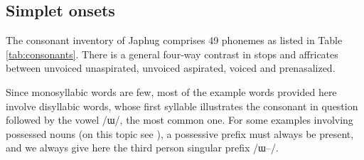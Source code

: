 \documentclass[oldfontcommands,oneside,a4paper,11pt]{article}
\newcommand{\ipa}[1]{/#1/} %
\begin{document}
 \subsection{Simplet onsets} \label{sec:simple}
 The consonant inventory of Japhug comprises 49 phonemes as listed in Table \ref{tab:consonants}. There is a general four-way contrast in stops and affricates between unvoiced unaspirated, unvoiced aspirated, voiced and prenasalized.
 
Since monosyllabic words are few,  most of the example words provided here involve disyllabic words, whose first syllable illustrates the consonant in question followed by the vowel \ipa{ɯ}, the most common one. For some examples involving possessed nouns (on this topic see \citealt[6]{jacques14antipassive}), a possessive prefix must always be present, and we always give here the third person singular prefix  \ipa{ɯ--}.
 
 \begin{table}
 \caption{Consonantal phonemes in Japhug Rgyalrong} \label{tab:consonants}  \centering
\end{table}
\end{document}
